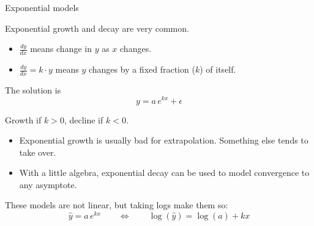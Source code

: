 \documentclass[
  ignorenonframetext,
]{beamer}
\providecommand{\tightlist}{%
  \setlength{\itemsep}{0pt}\setlength{\parskip}{0pt}}
\begin{document}
\begin{frame}{Exponential models}
\protect\hypertarget{exponential-models}{}

Exponential growth and decay are very common.

\begin{itemize}
\tightlist
\item
  \(\frac{dy}{dx}\) means change in \(y\) as \(x\) changes.
\item
  \(\frac{dy}{dx}=k \cdot y\) means \(y\) changes by a fixed fraction
  (\(k\)) of itself.
\end{itemize}

The solution is \[
y=a\,e^{kx}+\epsilon
\]

Growth if \(k>0\), decline if \(k<0\).

\begin{itemize}
\tightlist
\item
  Exponential growth is usually bad for extrapolation. Something else
  tends to take over.
\item
  With a little algebra, exponential decay can be used to model
  convergence to any asymptote.
\end{itemize}

These models are not linear, but taking logs make them so: \[
\hat{y}=a\,e^{kx} \qquad \iff \qquad \log(\hat{y})=\log(a)+kx
\]

\end{frame}
\end{document}
